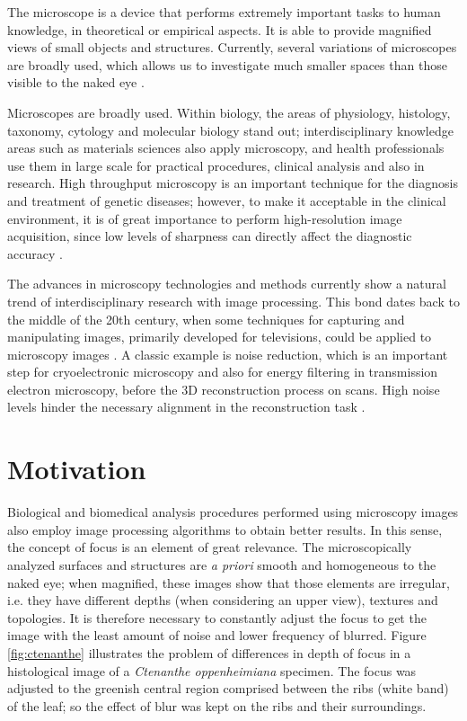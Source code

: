 The microscope is a device that performs extremely important tasks to human knowledge, in theoretical or empirical aspects. It is able to provide magnified views of small objects and structures. Currently, several variations of microscopes are broadly used, which allows us to investigate much smaller spaces than those visible to the naked eye \cite{wu2008microscope}.

Microscopes are broadly used. Within biology, the areas of physiology, histology, taxonomy, cytology and molecular biology stand out; interdisciplinary knowledge areas such as materials sciences also apply microscopy, and health professionals use them in large scale for practical procedures, clinical analysis and also in research. High throughput microscopy is an important technique for the diagnosis and treatment of genetic diseases; however, to make it acceptable in the clinical environment, it is of great importance to perform high-resolution image acquisition, since low levels of sharpness can directly affect the diagnostic accuracy \cite{qiu2013evaluations}.

The advances in microscopy technologies and methods currently show a natural trend of interdisciplinary research with image processing. This bond dates back to the middle of the 20th century, when some techniques for capturing and manipulating images, primarily developed for televisions, could be
applied to microscopy images \cite{wu2008microscope}. A classic example is noise reduction, which is an important step for cryoelectronic microscopy and also for energy filtering in transmission electron microscopy, before the 3D reconstruction process on  scans. High noise levels hinder the necessary alignment in the reconstruction task \cite{vyas2017multiscale}.

\section{Motivation}

Biological and biomedical analysis procedures performed using microscopy images also employ image processing algorithms to obtain better results. In this sense, the concept of focus is an element of great relevance. The microscopically analyzed surfaces and structures are \emph{a priori} smooth and homogeneous to the naked eye; when magnified, these images show that those elements are irregular, i.e. they have different depths (when considering an upper view), textures and topologies. It is therefore necessary to constantly adjust the focus to get the image with the least amount of noise and lower frequency of blurred. Figure \ref{fig:ctenanthe} illustrates the problem of differences in depth of focus in a histological image of a \emph{Ctenanthe oppenheimiana} specimen. The focus was adjusted to the greenish central region comprised between the ribs (white band) of the leaf; so the effect of blur was kept on the ribs and their surroundings.

